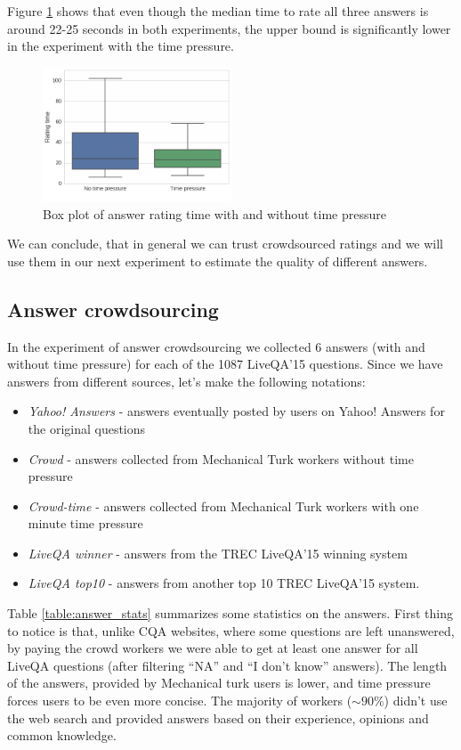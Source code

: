 \documentclass[11pt,letterpaper]{article}
\begin{document}
Figure \ref{figure:validation_time} shows that even though the median time to rate all three answers is around 22-25 seconds in both experiments, the upper bound is significantly lower in the experiment with the time pressure.

\begin{figure}[t!]
	\centering
	\includegraphics[width=0.5\textwidth]{img/validation_time}
	\caption{Box plot of answer rating time with and without time pressure}
	\label{figure:validation_time}
\end{figure}

We can conclude, that in general we can trust crowdsourced ratings and we will use them in our next experiment to estimate the quality of different answers.

\subsection{Answer crowdsourcing}
\label{subsec:results:answer_crowd}

In the experiment of answer crowdsourcing we collected 6 answers (with and without time pressure) for each of the 1087 LiveQA'15 questions.
Since we have answers from different sources, let's make the following notations:
\begin{itemize}
	\item \textit{Yahoo! Answers} - answers eventually posted by users on Yahoo! Answers for the original questions
	\item \textit{Crowd} - answers collected from Mechanical Turk workers without time pressure
	\item \textit{Crowd-time} - answers collected from Mechanical Turk workers with one minute time pressure
	\item \textit{LiveQA winner} - answers from the TREC LiveQA'15 winning system
	\item \textit{LiveQA top10} - answers from another top 10 TREC LiveQA'15 system.
\end{itemize}

Table \ref{table:answer_stats} summarizes some statistics on the answers.
First thing to notice is that, unlike CQA websites, where some questions are left unanswered, by paying the crowd workers we were able to get at least one answer for all LiveQA questions (after filtering ``NA'' and ``I don't know'' answers).
The length of the answers, provided by Mechanical turk users is lower, and time pressure forces users to be even more concise.
The majority of workers ($\sim90 \%$) didn't use the web search and provided answers based on their experience, opinions and common knowledge.
\end{document}

